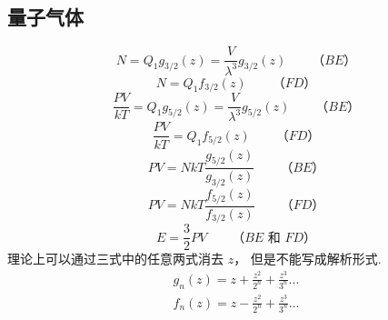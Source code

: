 \subsection{量子气体}
\begin{equation}
N = {Q_1}{g_{3/2}}\left( z \right) = \frac{V}{{{\lambda ^3}}}{g_{3/2}}\left( z \right)
\qquad
\text{（$BE$）}
\end{equation}
\begin{equation}
N = {Q_1}{f_{3/2}}\left( z \right)
\qquad
\text{（$FD$）}
\end{equation}
\begin{equation}
\frac{{PV}}{{kT}} = {Q_1}{g_{5/2}}\left( z \right) = \frac{V}{{{\lambda ^3}}}{g_{5/2}}\left( z \right)
\qquad
\text{（$BE$）}
\end{equation}
\begin{equation}
\frac{{PV}}{{kT}} = {Q_1}{f_{5/2}}\left( z \right)
\qquad
\text{（$FD$）}
\end{equation}
\begin{equation}
PV = NkT\frac{{{g_{5/2}}(z)}}{{{g_{3/2}}(z)}}
\qquad
\text{（$BE$）}
\end{equation}
\begin{equation}
PV = NkT\frac{{{f_{5/2}}(z)}}{{{f_{3/2}}(z)}}
\qquad
\text{（$FD$）}
\end{equation}
\begin{equation}
E = \frac{3}{2}PV
\qquad
\text{（$BE$ 和 $FD$）}
\end{equation}
理论上可以通过三式中的任意两式消去 $z$，  但是不能写成解析形式.
\begin{equation}
\begin{aligned}
{g_n}(z) = z + \frac{{{z^2}}}{{{2^n}}} + \frac{{{z^3}}}{{{3^n}}}...\\
{f_n}(z) = z - \frac{{{z^2}}}{{{2^n}}} + \frac{{{z^3}}}{{{3^n}}}...
\end{aligned}
\end{equation}
